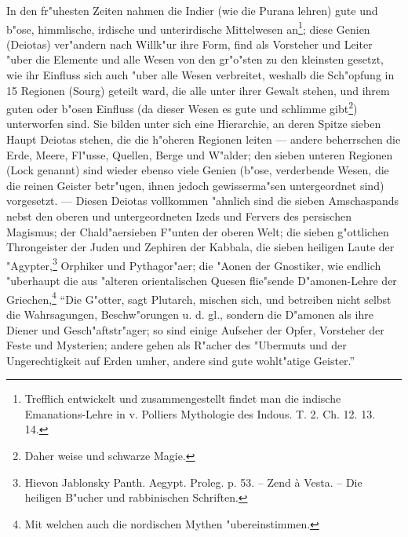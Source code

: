 \documentclass[a4paper, 11pt, oneside, polutonikogreek, german]{article}
\begin{document}
In den fr"uhesten Zeiten nahmen die Indier (wie die Purana lehren) gute und b"ose, himmlische, irdische und unterirdische Mittelwesen an\footnote{Trefflich entwickelt und zusammengestellt findet man die indische Emanations-Lehre in v. Polliers Mythologie des Indous. T. 2. Ch. 12. 13. 14.}; diese Genien (Deiotas) ver"andern nach Willk"ur ihre Form, find als Vorsteher und Leiter "uber die Elemente und alle Wesen von den gr"o"sten zu den kleinsten gesetzt, wie ihr Einfluss sich auch "uber alle Wesen verbreitet, weshalb die Sch"opfung in 15 Regionen (Sourg) geteilt ward, die alle unter ihrer Gewalt stehen, und ihrem guten oder b"osen Einfluss (da dieser Wesen es gute und schlimme gibt\footnote{Daher weise und schwarze Magie.}) unterworfen sind. Sie bilden unter sich eine Hierarchie, an deren Spitze sieben Haupt Deiotas stehen, die die h"oheren Regionen leiten --- andere beherrschen die Erde, Meere, Fl"usse, Quellen, Berge und W"alder; den sieben unteren Regionen (Lock genannt) sind wieder ebenso viele Genien (b"ose, verderbende Wesen, die die reinen Geister betr"ugen, ihnen jedoch gewisserma"sen untergeordnet sind) vorgesetzt. --- Diesen Deiotas vollkommen "ahnlich sind die sieben Amschaspands nebst den oberen und untergeordneten Izeds und Fervers des persischen Magismus; der Chald"aersieben F"unten der oberen Welt; die sieben g"ottlichen Throngeister der Juden und Zephiren der Kabbala, die sieben heiligen Laute der "Agypter,\footnote{Hievon Jablonsky Panth. Aegypt. Proleg. p. 53. -- Zend à Vesta. -- Die heiligen B"ucher und rabbinischen Schriften.} Orphiker und Pythagor"aer; die "Aonen der Gnostiker, wie endlich "uberhaupt die aus "alteren orientalischen Quesen flie"sende D"amonen-Lehre der Griechen,\footnote{Mit welchen auch die nordischen Mythen "ubereinstimmen.} "`Die G"otter, sagt Plutarch, mischen sich, und betreiben nicht selbst die Wahrsagungen, Beschw"orungen u. d. gl., sondern die D"amonen als ihre Diener und Gesch"aftstr"ager; so sind einige Aufseher der Opfer, Vorsteher der Feste und Mysterien; andere gehen als R"acher des "Ubermuts und der Ungerechtigkeit auf Erden umher, andere sind gute wohlt"atige Geister."'
\end{document}
